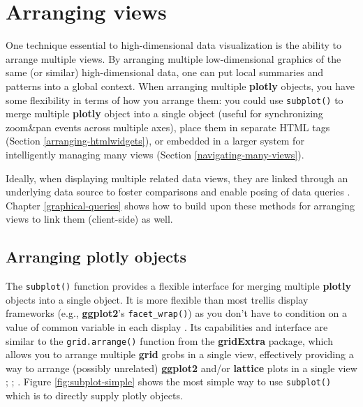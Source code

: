 \documentclass[
  12pt,
]{krantz}
\begin{document}
\hypertarget{arranging-views}{%
\chapter{Arranging views}\label{arranging-views}}

One technique essential to high-dimensional data visualization is the ability to arrange multiple views. By arranging multiple low-dimensional graphics of the same (or similar) high-dimensional data, one can put
local summaries and patterns into a global context. When arranging multiple \textbf{plotly} objects, you have some flexibility in terms of how you arrange them: you could use \texttt{subplot()} to merge multiple \textbf{plotly} object into a single object (useful for synchronizing zoom\&pan events across multiple axes), place them in separate HTML tags (Section \ref{arranging-htmlwidgets}), or embedded in a larger system for intelligently managing many views (Section \ref{navigating-many-views}).

Ideally, when displaying multiple related data views, they are linked through an underlying data source to foster comparisons and enable posing of data queries \citep{Cook:2007uk}. Chapter \ref{graphical-queries} shows how to build upon these methods for arranging views to link them (client-side) as well.

\hypertarget{arranging-plotly-objects}{%
\section{Arranging plotly objects}\label{arranging-plotly-objects}}

The \texttt{subplot()} function provides a flexible interface for merging multiple \textbf{plotly} objects into a single object. It is more flexible than most trellis display frameworks (e.g., \textbf{ggplot2}'s \texttt{facet\_wrap()}) as you don't have to condition on a value of common variable in each display \citep{trellis}. Its capabilities and interface are similar to the \texttt{grid.arrange()} function from the \textbf{gridExtra} package, which allows you to arrange multiple \textbf{grid} grobs in a single view, effectively providing a way to arrange (possibly unrelated) \textbf{ggplot2} and/or \textbf{lattice} plots in a single view \citep{RCore}; \citep{gridExtra}; \citep{lattice}. Figure \ref{fig:subplot-simple} shows the most simple way to use \texttt{subplot()} which is to directly supply plotly objects.
\end{document}
